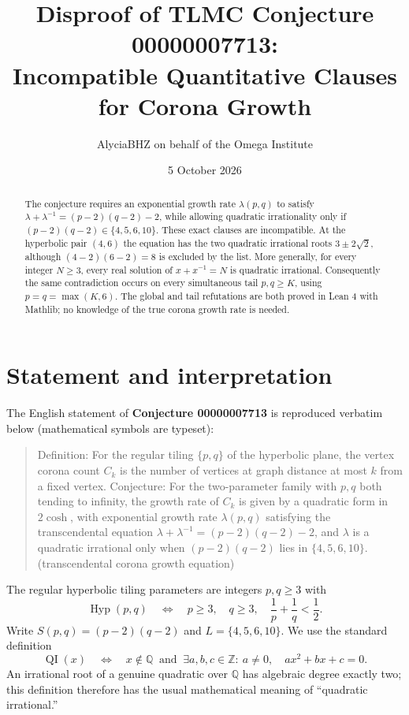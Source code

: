\documentclass[11pt]{article}
\title{Disproof of TLMC Conjecture 00000007713:\\Incompatible Quantitative Clauses for Corona Growth}
\author{AlyciaBHZ on behalf of the Omega Institute}
\date{5 October 2026}
\newcommand{\QI}{\operatorname{QI}}
\newcommand{\HH}{\operatorname{Hyp}}
\begin{document}
\maketitle

\begin{abstract}
The conjecture requires an exponential growth rate $\lambda(p,q)$ to satisfy
$\lambda+\lambda^{-1}=(p-2)(q-2)-2$, while allowing quadratic irrationality
only if $(p-2)(q-2)\in\{4,5,6,10\}$. These exact clauses are incompatible.
At the hyperbolic pair $(4,6)$ the equation has the two quadratic irrational
roots $3\pm2\sqrt2$, although $(4-2)(6-2)=8$ is excluded by the list.
More generally, for every integer $N\ge3$, every real solution of
$x+x^{-1}=N$ is quadratic irrational. Consequently the same contradiction
occurs on every simultaneous tail $p,q\ge K$, using $p=q=\max(K,6)$.
The global and tail refutations are both proved in Lean 4 with Mathlib;
no knowledge of the true corona growth rate is needed.
\end{abstract}

\section{Statement and interpretation}
The English statement of \textbf{Conjecture 00000007713} is reproduced
verbatim below (mathematical symbols are typeset):
\begin{quote}
Definition: For the regular tiling $\{p,q\}$ of the hyperbolic plane, the vertex
corona count $C_k$ is the number of vertices at graph distance at most $k$
from a fixed vertex. Conjecture: For the two-parameter family with $p,q$ both
tending to infinity, the growth rate of $C_k$ is given by a quadratic form
in $2\cosh$, with exponential growth rate $\lambda(p,q)$ satisfying the
transcendental equation $\lambda+\lambda^{-1}=(p-2)(q-2)-2$, and $\lambda$ is
a quadratic irrational only when $(p-2)(q-2)$ lies in $\{4,5,6,10\}$.
(transcendental corona growth equation)
\end{quote}

The regular hyperbolic tiling parameters are integers $p,q\ge3$ with
\[
\HH(p,q)\quad\Longleftrightarrow\quad
p\ge3,\quad q\ge3,\quad \frac1p+\frac1q<\frac12.
\]
Write $S(p,q)=(p-2)(q-2)$ and $L=\{4,5,6,10\}$. We use the standard definition
\[
\QI(x)\quad\Longleftrightarrow\quad
x\notin\mathbb Q\ \text{ and }\
\exists a,b,c\in\mathbb Z:\ a\ne0,\quad ax^2+bx+c=0.
\]
An irrational root of a genuine quadratic over $\mathbb Q$ has algebraic
degree exactly two; this definition therefore has the usual mathematical
meaning of ``quadratic irrational.''
\end{document}
